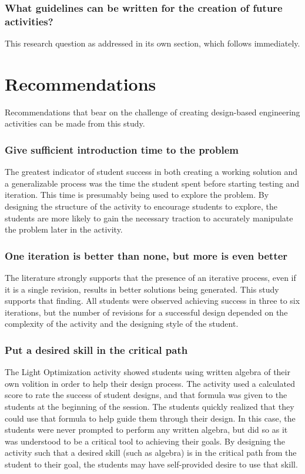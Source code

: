 \subsubsection{What guidelines can be written for the creation of future activities?}
	This research question as addressed in its own section, which follows immediately.

\section{Recommendations } \label{sec:recommendations}

Recommendations that bear on the challenge of creating design-based engineering activities can be made from this study. 

\subsubsection{Give sufficient introduction time to the problem}
The greatest indicator of student success in both creating a working solution and a generalizable process was the time the student spent before starting testing and iteration. This time is presumably being used to explore the problem. By designing the structure of the activity to encourage students to explore, the students are more likely to gain the necessary traction to accurately manipulate the problem later in the activity.

\subsubsection{One iteration is better than none, but more is even better}
The literature strongly supports that the presence of an iterative process, even if it is a single revision, results in better solutions being generated. This study supports that finding. All students were observed achieving success in three to six iterations, but the number of revisions for a successful design depended on the complexity of the activity and the designing style of the student.

\subsubsection{Put a desired skill in the critical path}
The Light Optimization activity showed students using written algebra of their own volition in order to help their design process. The activity used a calculated score to rate the success of student designs, and that formula was given to the students at the beginning of the session. The students quickly realized that they could use that formula to help guide them through their design. In this case, the students were never prompted to perform any written algebra, but did so as it was understood to be a critical tool to achieving their goals. By designing the activity such that a desired skill (such as algebra) is in the critical path from the student to their goal, the students may have self-provided desire to use that skill.

